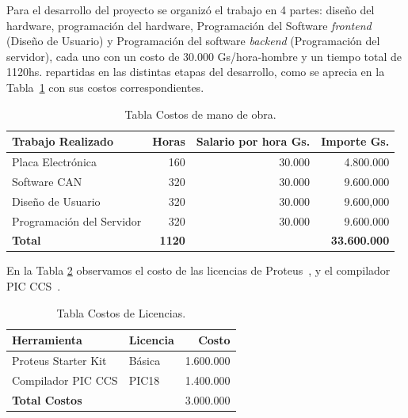 Para el desarrollo del proyecto se organizó el trabajo en 4 partes:  diseño del hardware, programación del hardware, Programación del Software \textit{frontend} (Diseño de Usuario) y Programación del software \textit{backend} (Programación del servidor), cada uno con un costo de 30.000 Gs/hora-hombre y un tiempo total de 1120hs. repartidas en las distintas etapas del desarrollo, como se aprecia en la Tabla~\ref{tabla:software} con sus costos correspondientes. 

\begin{table}[H]
\begin{center}
\begin{tabular}{l r r r}
\toprule
\textbf{Trabajo Realizado} & \textbf{Horas}&\textbf{Salario por hora Gs.} & \textbf{Importe Gs.} \\ \hline

 Placa Electrónica & 160 & 30.000  & 4.800.000     \\ 
 Software CAN      & 320 & 30.000  & 9.600.000     \\ 
 Diseño de Usuario & 320 & 30.000  & 9.600,000     \\ 
 Programación del Servidor & 320 & 30.000 & 9.600.000 \\ 
 \textbf{ Total } & \textbf{1120} & & \textbf{33.600.000} \\ %
\bottomrule
\end{tabular}
\caption{Tabla Costos de mano de obra.}
\label{tabla:software}
\end{center}
\end{table}



En la Tabla \ref{tabla:licencias} observamos el costo de las licencias de Proteus~\cite{licenp}, y el compilador PIC CCS~\cite{pic_ccs}.
\begin{table}[H]
\begin{center}
\begin{tabular}{l l r }
\toprule
\textbf{Herramienta} & \textbf{Licencia} & \textbf{Costo}  \\ 
\midrule
Proteus Starter Kit  & Básica & 1.600.000  \\ 
Compilador PIC CCS   & PIC18  & 1.400.000  \\ 
\textbf{Total Costos} &  &   3.000.000     \\ \bottomrule
\end{tabular}
\caption{Tabla Costos de Licencias.}
\label{tabla:licencias}
\end{center}
\end{table}


